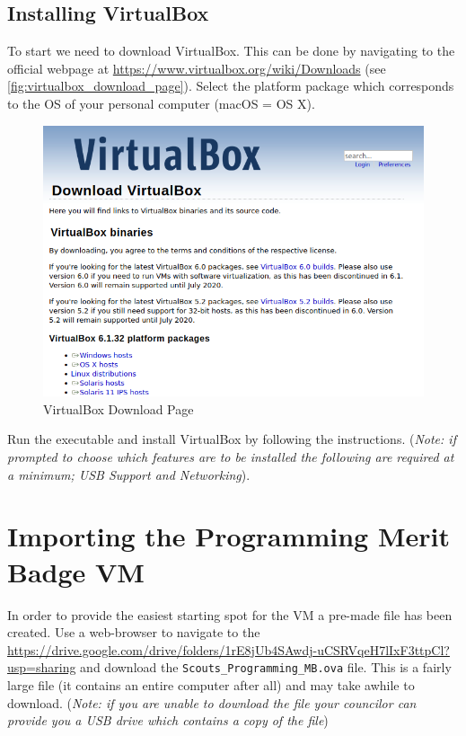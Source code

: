     \subsection{Installing VirtualBox}
    \label{ssec:installing_virtualbox}

      To start we need to download VirtualBox.
      This can be done by navigating to the official webpage at \href{https://www.virtualbox.org/wiki/Downloads}
        {https://www.virtualbox.org/wiki/Downloads} (see \autoref{fig:virtualbox_download_page}).
      Select the platform package which corresponds to the OS of your personal computer (macOS = OS X).
      
      \begin{figure}[ht]
        \centering
        \includegraphics[width=0.8\linewidth]{virtualbox_download_page.png}
        \caption{VirtualBox Download Page}
        \label{fig:virtualbox_download_page}
      \end{figure}
      \FloatBarrier

      Run the executable and install VirtualBox by following the instructions.
      (\textit{Note: if prompted to choose which features are to be installed the following are required at a minimum; USB Support and Networking}).

  \section{Importing the Programming Merit Badge VM}
  \label{sec:import_merit_badge_vm}

    In order to provide the easiest starting spot for the VM a pre-made file has been created.
    Use a web-browser to navigate to the \href{Google Drive Folder}{https://drive.google.com/drive/folders/1rE8jUb4SAwdj-uCSRVqeH7lIxF3ttpCl?usp=sharing}
      and download the \texttt{Scouts\_Programming\_MB.ova} file.
    This is a fairly large file (it contains an entire computer after all) and may take awhile to download.
    (\textit{Note: if you are unable to download the file your councilor can provide you a USB drive which contains a copy of the file})

